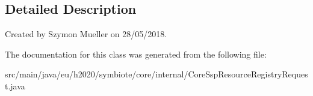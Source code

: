 \subsection{Detailed Description}
Created by Szymon Mueller on 28/05/2018. 

The documentation for this class was generated from the following file\+:\begin{DoxyCompactItemize}
\item 
src/main/java/eu/h2020/symbiote/core/internal/Core\+Ssp\+Resource\+Registry\+Request.\+java\end{DoxyCompactItemize}
